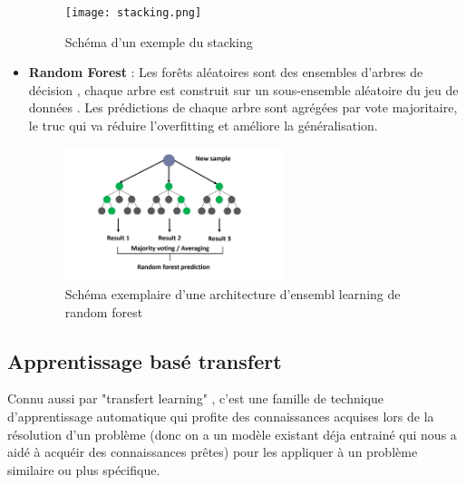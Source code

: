 \begin{itemize}[label=$\bullet$]
    \begin{figure}[htbp]
    \centering
    \texttt{[image: stacking.png]}
     \caption{Schéma d'un exemple du stacking\cite{stacking}}
     \label{fig:example20}
     \end{figure}
\newpage     
\item \textbf{Random Forest} :
Les forêts aléatoires sont des ensembles d’arbres de décision ,
chaque arbre est construit sur un sous-ensemble aléatoire du jeu de données . Les prédictions de chaque arbre sont agrégées par vote majoritaire, le truc qui va réduire l'overfitting et améliore la généralisation.

\begin{figure}[htbp]
     \centering    \includegraphics[width=0.6\textwidth,height=0.3\textheight]{img/random_forest.png}
     \caption{Schéma exemplaire d'une architecture d'ensembl learning de random forest \cite{random_forest}}
     \label{fig:example21}
     \end{figure}



\end{itemize}
\subsection{Apprentissage basé transfert}
Connu aussi par "transfert learning" , c'est une famille de technique d’apprentissage automatique qui profite des connaissances acquises lors de la résolution d’un problème (donc on a un modèle existant déja entrainé qui nous a aidé à acquéir des connaissances prêtes) pour les appliquer à un problème similaire ou plus spécifique.


